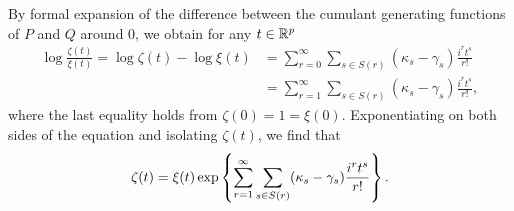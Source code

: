 By formal expansion of the difference between the cumulant generating functions of $P$ and $Q$ around 0, we obtain for any $t \in {\mathbb{R}^p}$
\begin{align*}
    \log \frac{\zeta(t)}{\xi(t)}
    = \log \zeta(t) - \log \xi(t) 
    &= \sum_{r=0}^\infty \sum_{s \in S(r)} (\kappa_s - \gamma_s)\frac{i^r t^s}{r!}\\
    &= \sum_{r=1}^\infty \sum_{s \in S(r)} (\kappa_s - \gamma_s)\frac{i^r t^s}{r!},
\end{align*}
where the last equality holds from $\zeta(0) = 1 = \xi(0)$. Exponentiating on both sides of the equation and isolating $\zeta(t)$, we find that
\begin{equation*}
    \zeta(t) = \xi(t)\exp\left\{\sum_{r=1}^\infty \sum_{s \in S(r)} (\kappa_s - \gamma_s)\frac{i^r t^s}{r!}\right\}.
\end{equation*}

